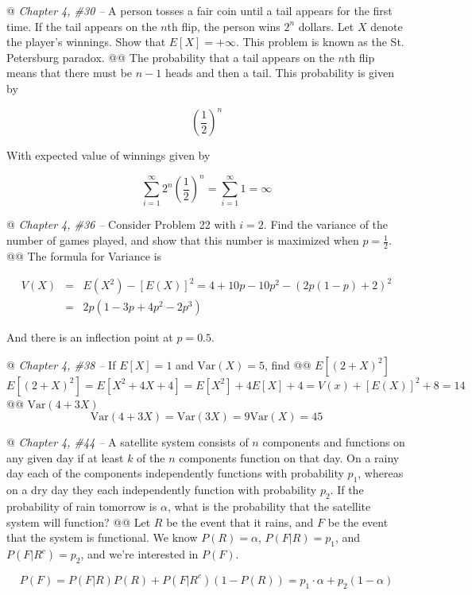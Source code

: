 \documentclass[10pt]{article}
\begin{document}
\begin{easylist}[enumerate]
    @ \textit{Chapter 4, \#30 --} A person tosses a fair coin until a tail appears for the first time. If the tail
    appears on the $n$th flip, the person wins $2^n$ dollars. Let $X$ denote the player's winnings. Show that $E[X] =
    +\infty$. This problem is known as the St. Petersburg paradox.
    @@ The probability that a tail appears on the $n$th flip means that there must be $n - 1$ heads and then a tail.
    This probability is given by

        \[ {\left( \frac{1}{2} \right)}^n \]

    With expected value of winnings given by

        \[ \sum_{i = 1}^{\infty} 2^n {\left( \frac{1}{2} \right)}^n = \sum_{i=1}^{\infty} 1 = \infty \]

    @ \textit{Chapter 4, \#36 --} Consider Problem 22 with $i = 2$. Find the variance of the number of games played,
    and show that this number is maximized when $p = \frac{1}{2}$.
    @@ The formula for Variance is

        \[ \begin{aligned}
            V(X) &=&  E(X^2) - {[E(X)]}^2 = 4 + 10p - 10p^2 - {(2p(1-p)+2)}^2\\
                 &=& 2 p (1 - 3 p + 4 p^2 - 2 p^3)
        \end{aligned} \]

        And there is an inflection point at $p=0.5$.

    @ \textit{Chapter 4, \#38 --} If $E[X] = 1$ and $\text{Var}(X) = 5$, find
    @@ $E[{(2 + X)}^2]$
        \[ E[{(2 + X)}^2] = E[X^2 + 4X + 4] = E[X^2] + 4 E[X] + 4 = V(x) + {[E(X)]}^2 + 8 = \boxed{14} \]
    @@ $\text{Var}(4 + 3X)$
        \[ \text{Var}(4 + 3X) = \text{Var}(3X) = 9 \text{Var}(X) = \boxed{45} \]

    @ \textit{Chapter 4, \#44 --} A satellite system consists of $n$ components and functions on any given day if at
    least $k$ of the $n$ components function on that day. On a rainy day each of the components independently functions
    with probability $p_1$, whereas on a dry day they each independently function with probability $p_2$. If the
    probability of rain tomorrow is $\alpha$, what is the probability that the satellite system will function?
    @@ Let $R$ be the event that it rains, and $F$ be the event that the system is functional. We know $P(R) = \alpha$,
    $P(F|R) = p_1$, and $P(F|R^c) = p_2$, and we're interested in $P(F)$.

        \[
            P(F) = P(F|R)P(R) + P(F|R^c)(1-P(R)) = p_1 \cdot \alpha + p_2 (1 - \alpha)
        \]


\end{easylist}
\end{document}
